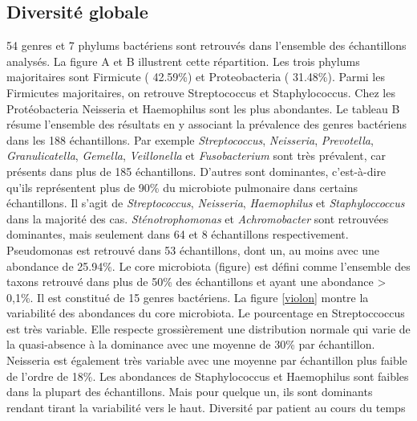 \documentclass[12pt,a4paper]{article}
\begin{document}
\subsection{Diversité globale}
54 genres et 7 phylums bactériens sont retrouvés dans l’ensemble des échantillons analysés. La figure A et B illustrent cette répartition.
Les trois phylums majoritaires sont Firmicute ( 42.59\%) et Proteobacteria ( 31.48\%). Parmi les Firmicutes majoritaires, on retrouve Streptococcus et Staphylococcus. Chez les Protéobacteria Neisseria et Haemophilus sont les plus abondantes.
Le tableau B résume l’ensemble des résultats en y associant la prévalence des genres bactériens dans les 188 échantillons.
Par exemple \textit{Streptococcus}, \textit{Neisseria}, \textit{Prevotella}, \textit{Granulicatella}, \textit{Gemella}, \textit{Veillonella} et \textit{Fusobacterium} sont très prévalent, car présents dans plus de 185 échantillons.
D’autres sont dominantes, c’est-à-dire qu’ils représentent plus de 90\% du microbiote pulmonaire dans certains échantillons. Il s’agit de \textit{Streptococcus}, \textit{Neisseria}, \textit{Haemophilus} et \textit{Staphyloccoccus} dans la majorité des cas. \textit{Sténotrophomonas} et \textit{Achromobacter} sont retrouvées dominantes, mais seulement dans 64 et 8 échantillons respectivement. Pseudomonas est retrouvé dans 53 échantillons, dont un, au moins avec une abondance de 25.94\%.
Le core microbiota (figure) est défini comme l’ensemble des taxons retrouvé dans plus de 50\% des échantillons et ayant une abondance > 0,1\%. Il est constitué de 15 genres bactériens.
La figure \ref{violon} montre la variabilité des abondances du core microbiota. Le pourcentage en Streptoccoccus est très variable. Elle respecte grossièrement une distribution normale qui varie de la quasi-absence à la dominance avec une moyenne de 30\% par échantillon.
Neisseria est également très variable avec une moyenne par échantillon plus faible de l’ordre de 18\%.
Les abondances de Staphylococcus et Haemophilus sont faibles dans la plupart des échantillons. Mais pour quelque un, ils sont dominants rendant tirant la variabilité vers le haut.
Diversité par patient au cours du temps
\end{document}

